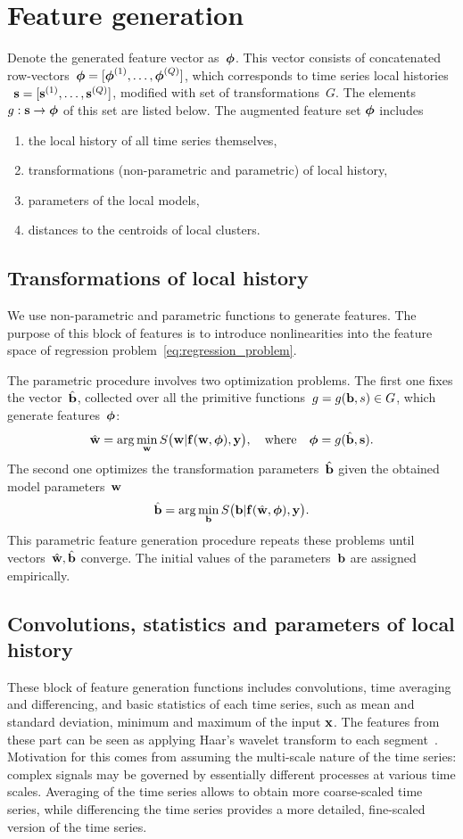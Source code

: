 \documentclass[conference]{IEEEtran}
\begin{document}
\section{Feature generation}\label{sc:feature_generation}
Denote the generated feature vector as~${\boldsymbol{\phi}}$. This vector consists of concatenated row-vectors~${\boldsymbol{\phi}}=[{\boldsymbol{\phi}}^{(1)},\dots,{\boldsymbol{\phi}}^{(Q)}]$, which corresponds to time series local histories ~${\mathbf{s}}=[{\mathbf{s}}^{(1)},\dots,{\mathbf{s}}^{(Q)}]$, modified with set of transformations~$G$. The elements~$g:{\mathbf{s}}\to{\boldsymbol{\phi}}$ of this set are listed below. The augmented feature set ${\boldsymbol{\phi}}$ includes
\begin{enumerate}[1)]
\item the local history of all time series themselves,
\item transformations (non-parametric and parametric) of local history,
\item parameters of the local models,
\item distances to the centroids of local clusters.
\end{enumerate}



\subsection{Transformations of local history}
We use non-parametric and parametric functions to generate features. The purpose of this block of features is to introduce nonlinearities into the feature space of regression problem~\eqref{eq:regression_problem}.

The parametric procedure involves two optimization problems. The first one fixes the vector~$\hat{{\mathbf{b}}}$, collected over all the primitive functions~$g=g({\mathbf{b}},s) \in G$, which generate features~${\boldsymbol{\phi}}$:
\[
\hat{\mathbf{w}} = \arg\min_{\mathbf{w}} S\bigl(\mathbf{w}|{\mathbf{f}}(\mathbf{w},{\boldsymbol{\phi}}),{\mathbf{y}}\bigr),\quad
\text{where}
\quad {\boldsymbol{\phi}} = g(\hat{{\mathbf{b}}},{\mathbf{s}}).
\]
The second one optimizes the transformation parameters~$\hat{{\mathbf{b}}}$ given the obtained model parameters~$\mathbf{w}$
\[
\hat{{\mathbf{b}}} = \arg\min_{{\mathbf{b}}} S\bigl({\mathbf{b}}|{\mathbf{f}}(\hat{\mathbf{w}},{\boldsymbol{\phi}}),{\mathbf{y}}\bigr).
\]
This parametric feature generation procedure repeats these problems until vectors~$\hat{\mathbf{w}},\hat{{\mathbf{b}}}$ converge. The initial values of the parameters~${\mathbf{b}}$ are assigned empirically.

\subsection{Convolutions, statistics and parameters of local history}
These block of feature generation functions includes convolutions, time averaging and differencing, and basic statistics of each time series, such as mean and standard deviation, minimum and maximum of the input ${\mathbf{x}}$. The features from these part can be seen as applying Haar's wavelet transform to each segment~\cite{Jiang2011}. Motivation for this comes from assuming the multi-scale nature of the time series: complex signals may be governed by essentially different processes at various time scales. Averaging of the time series allows to obtain more coarse-scaled time series, while differencing the time series provides a more detailed, fine-scaled version of the time series.
\end{document}
